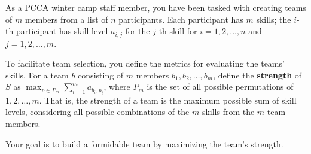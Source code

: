 As a PCCA winter camp staff member, you have been tasked with creating teams of $m$ members from a list of $n$ participants.
Each participant has $m$ skills; the $i$-th participant has skill level $a_{i,j}$ for the $j$-th skill for $i = 1,2,\ldots,n$ and $j = 1,2,\ldots,m$.

To facilitate team selection, you define the metrics for evaluating the teams' skills.
For a team $b$ consisting of $m$ members $b_1,b_2,\ldots,b_m$, define the \textbf{strength} of $S$ as $\displaystyle\max_{p \in P_m} \sum_{i=1}^{m} a_{b_i,p_i}$, where $P_m$ is the set of all possible permutations of $1,2,\ldots,m$.
That is, the strength of a team is the maximum possible sum of skill levels, considering all possible combinations of the $m$ skills from the $m$ team members.

Your goal is to build a formidable team by maximizing the team's strength.